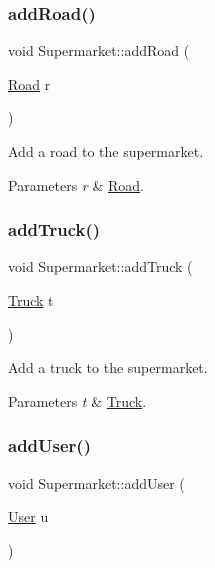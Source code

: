 \subsubsection{\texorpdfstring{add\+Road()}{addRoad()}}
{\footnotesize\ttfamily void Supermarket\+::add\+Road (\begin{DoxyParamCaption}\item[{\hyperlink{class_road}{Road}}]{r }\end{DoxyParamCaption})}



Add a road to the supermarket. 


\begin{DoxyParams}{Parameters}
{\em r} & \hyperlink{class_road}{Road}. \\
\hline
\end{DoxyParams}
\mbox{\label{class_supermarket_a6c3cb4629ad39cfd581fb6527390f13f}} 
\subsubsection{\texorpdfstring{add\+Truck()}{addTruck()}}
{\footnotesize\ttfamily void Supermarket\+::add\+Truck (\begin{DoxyParamCaption}\item[{\hyperlink{class_truck}{Truck}}]{t }\end{DoxyParamCaption})}



Add a truck to the supermarket. 


\begin{DoxyParams}{Parameters}
{\em t} & \hyperlink{class_truck}{Truck}. \\
\hline
\end{DoxyParams}
\mbox{\label{class_supermarket_a89fbe6a4ae27587af7dc9644f84bd5d5}} 
\subsubsection{\texorpdfstring{add\+User()}{addUser()}}
{\footnotesize\ttfamily void Supermarket\+::add\+User (\begin{DoxyParamCaption}\item[{\hyperlink{class_user}{User}}]{u }\end{DoxyParamCaption})}



